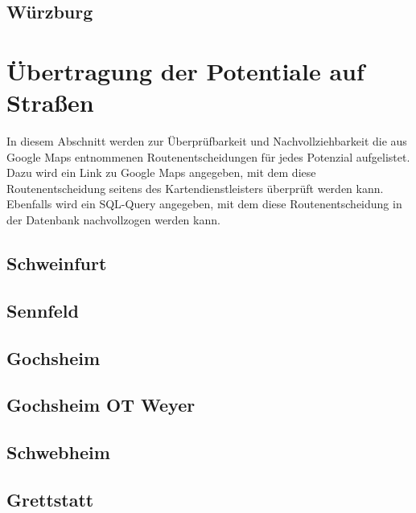 \documentclass[fontsize=12pt,a4paper]{scrreprt}
\begin{document}
\subsection{Würzburg}


\section{Übertragung der Potentiale auf Straßen}
In diesem Abschnitt werden zur Überprüfbarkeit und Nachvollziehbarkeit die aus Google Maps entnommenen Routenentscheidungen für jedes Potenzial aufgelistet. Dazu wird ein Link zu Google Maps angegeben, mit dem diese Routenentscheidung seitens des Kartendienstleisters überprüft werden kann. Ebenfalls wird ein SQL-Query angegeben, mit dem diese Routenentscheidung in der Datenbank nachvollzogen werden kann.

\storeareas\meinegespeichertenWerte
\newpage
{}
\areaset{28cm}{17cm}

        \subsection{Schweinfurt}
        

        \subsection{Sennfeld}
        

        \subsection{Gochsheim}
        

        \subsection{Gochsheim OT Weyer}
        

        \subsection{Schwebheim}
        

        \subsection{Grettstatt}
        
\end{document}
